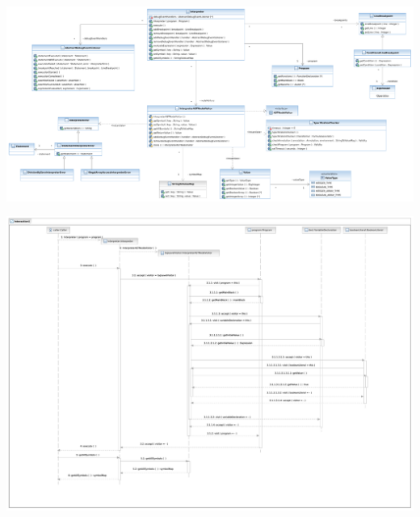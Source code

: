 \includegraphics[angle=90,height=\textheight]{diagrams/interpreter_component.pdf}
\newpage

\hspace{-2cm}
\includegraphics[angle=90,height=\textheight]{diagrams/interpreter_functioncall_sequence.pdf}
